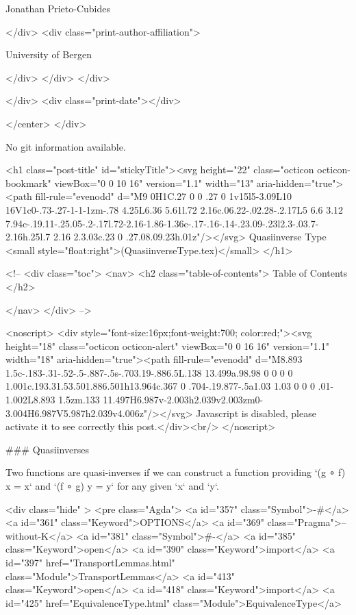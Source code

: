                   Jonathan Prieto-Cubides
                
              </div>
              <div class="print-author-affiliation">
                
                  University of Bergen
                
                </div>
            </div>
          </div>
          
          
        </div>
        <div class="print-date"></div>
        
        
    </center>
  </div>

  
  No git information available.
  

  <h1 class="post-title" id="stickyTitle"><svg height="22" class="octicon octicon-bookmark" viewBox="0 0 10 16" version="1.1" width="13" aria-hidden="true"><path fill-rule="evenodd" d="M9 0H1C.27 0 0 .27 0 1v15l5-3.09L10 16V1c0-.73-.27-1-1-1zm-.78 4.25L6.36 5.61l.72 2.16c.06.22-.02.28-.2.17L5 6.6 3.12 7.94c-.19.11-.25.05-.2-.17l.72-2.16-1.86-1.36c-.17-.16-.14-.23.09-.23l2.3-.03.7-2.16h.25l.7 2.16 2.3.03c.23 0 .27.08.09.23h.01z"/></svg> Quasiinverse Type <small style="float:right">(QuasiinverseType.tex)</small>
  </h1>

  <!-- 
  <div class="toc">
    <nav>
    <h2 class="table-of-contents"> Table of Contents </h2>
      

    </nav>
  </div>
   -->

  <noscript>
  <div style="font-size:16px;font-weight:700; color:red;"><svg height="18" class="octicon octicon-alert" viewBox="0 0 16 16" version="1.1" width="18" aria-hidden="true"><path fill-rule="evenodd" d="M8.893 1.5c-.183-.31-.52-.5-.887-.5s-.703.19-.886.5L.138 13.499a.98.98 0 0 0 0 1.001c.193.31.53.501.886.501h13.964c.367 0 .704-.19.877-.5a1.03 1.03 0 0 0 .01-1.002L8.893 1.5zm.133 11.497H6.987v-2.003h2.039v2.003zm0-3.004H6.987V5.987h2.039v4.006z"/></svg> Javascript is disabled, please activate it to see correctly this post.</div><br/>
  </noscript>

  ### Quasiinverses

Two functions are quasi-inverses if we can construct a function providing
`(g ∘ f) x = x` and `(f ∘ g) y = y` for any given `x` and `y`.

<div class="hide" >
<pre class="Agda">
<a id="357" class="Symbol">{-#</a> <a id="361" class="Keyword">OPTIONS</a> <a id="369" class="Pragma">--without-K</a> <a id="381" class="Symbol">#-}</a>
<a id="385" class="Keyword">open</a> <a id="390" class="Keyword">import</a> <a id="397" href="TransportLemmas.html" class="Module">TransportLemmas</a>
<a id="413" class="Keyword">open</a> <a id="418" class="Keyword">import</a> <a id="425" href="EquivalenceType.html" class="Module">EquivalenceType</a>


